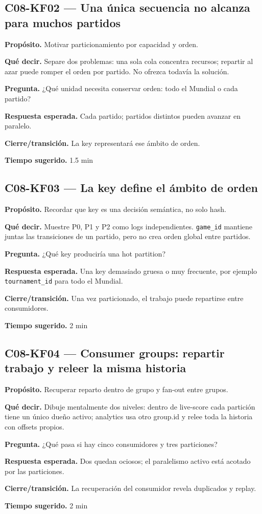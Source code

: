 \documentclass[variant=docente,cover=institutional,mode=screen]{ua-engineering-v6-article}
\newcommand{\FrameField}[2]{\par\noindent\textbf{#1.} #2\par}
\begin{document}
\subsection*{C08-KF02 --- Una única secuencia no alcanza para muchos partidos}
\FrameField{Propósito}{Motivar particionamiento por capacidad y orden.}
\FrameField{Qué decir}{Separe dos problemas: una sola cola concentra recursos; repartir al azar puede romper el orden por partido. No ofrezca todavía la solución.}
\FrameField{Pregunta}{¿Qué unidad necesita conservar orden: todo el Mundial o cada partido?}
\FrameField{Respuesta esperada}{Cada partido; partidos distintos pueden avanzar en paralelo.}
\FrameField{Cierre/transición}{La key representará ese ámbito de orden.}
\FrameField{Tiempo sugerido}{1.5 min}

\subsection*{C08-KF03 --- La key define el ámbito de orden}
\FrameField{Propósito}{Recordar que key es una decisión semántica, no solo hash.}
\FrameField{Qué decir}{Muestre P0, P1 y P2 como logs independientes. \texttt{game\_id} mantiene juntas las transiciones de un partido, pero no crea orden global entre partidos.}
\FrameField{Pregunta}{¿Qué key produciría una hot partition?}
\FrameField{Respuesta esperada}{Una key demasiado gruesa o muy frecuente, por ejemplo \texttt{tournament\_id} para todo el Mundial.}
\FrameField{Cierre/transición}{Una vez particionado, el trabajo puede repartirse entre consumidores.}
\FrameField{Tiempo sugerido}{2 min}

\subsection*{C08-KF04 --- Consumer groups: repartir trabajo y releer la misma historia}
\FrameField{Propósito}{Recuperar reparto dentro de grupo y fan-out entre grupos.}
\FrameField{Qué decir}{Dibuje mentalmente dos niveles: dentro de live-score cada partición tiene un único dueño activo; analytics usa otro group.id y relee toda la historia con offsets propios.}
\FrameField{Pregunta}{¿Qué pasa si hay cinco consumidores y tres particiones?}
\FrameField{Respuesta esperada}{Dos quedan ociosos; el paralelismo activo está acotado por las particiones.}
\FrameField{Cierre/transición}{La recuperación del consumidor revela duplicados y replay.}
\FrameField{Tiempo sugerido}{2 min}
\end{document}
